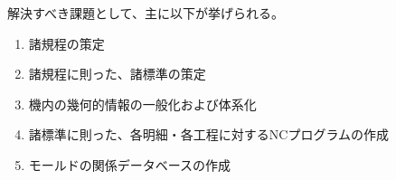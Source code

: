 \clearpage
解決すべき課題として、主に以下が挙げられる。
\begin{enumerate}[label=\sarrow]
\item 諸規程の策定
\item 諸規程に則った、諸標準の策定
\item 機内の幾何的情報の一般化および体系化
\item 諸標準に則った、各明細・各工程に対するNCプログラムの作成
\item モールドの関係データベースの作成
\end{enumerate}

